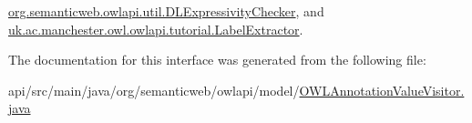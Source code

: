 \hyperlink{classorg_1_1semanticweb_1_1owlapi_1_1util_1_1_d_l_expressivity_checker_a1301d51a6f05d89a67833d637e8091a3}{org.\-semanticweb.\-owlapi.\-util.\-D\-L\-Expressivity\-Checker}, and \hyperlink{classuk_1_1ac_1_1manchester_1_1owl_1_1owlapi_1_1tutorial_1_1_label_extractor_a61808097b4b4d431c42d7229a294a945}{uk.\-ac.\-manchester.\-owl.\-owlapi.\-tutorial.\-Label\-Extractor}.



The documentation for this interface was generated from the following file\-:\begin{DoxyCompactItemize}
\item 
api/src/main/java/org/semanticweb/owlapi/model/\hyperlink{_o_w_l_annotation_value_visitor_8java}{O\-W\-L\-Annotation\-Value\-Visitor.\-java}\end{DoxyCompactItemize}
